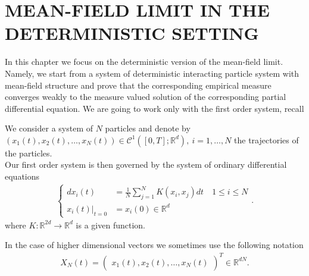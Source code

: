 \chapter{MEAN-FIELD LIMIT IN THE DETERMINISTIC SETTING}
In this chapter we focus on the deterministic version of the mean-field limit. Namely, we
start from a system of deterministic interacting particle system with mean-field structure
and prove that the corresponding empirical measure converges weakly to the measure valued solution of 
the corresponding partial differential equation. We are going to work only with the first order system, recall
\begin{Definition}
  We consider a system of $N$ particles and denote by $(x_{1}(t),x_{2}(t),\ldots,x_N(t)) \in  \mathcal{C}^{1}([0,T];\mathbb{R}^{d} ),\ i=1,\ldots ,N $ 
  the trajectories of the particles.\\[1ex]
  Our first order system is then governed by the system of ordinary differential equations 
  \begin{align*}
    \begin{cases}
      d x_i(t) &= \frac{1}{N}\sum_{j=1}^{N} K(x_{i},x_{j}) dt  \quad 1\le i \le N \\
        x_i(t)\rvert_{t=0} &= x_i(0) \in \mathbb{R}^{d} 
    \end{cases}
  .\end{align*}
  where $K : \mathbb{R}^{2d} \to \mathbb{R}^{d}  $ is a given function.\\[1ex]
\end{Definition}
 In the case of higher dimensional vectors we sometimes  use the following notation 
 \begin{align*}
  X_N(t) = \begin{pmatrix} x_{1}(t),x_2(t),\ldots ,x_N(t) \end{pmatrix}^{T}  \in \mathbb{R}^{dN} 
 .\end{align*}
